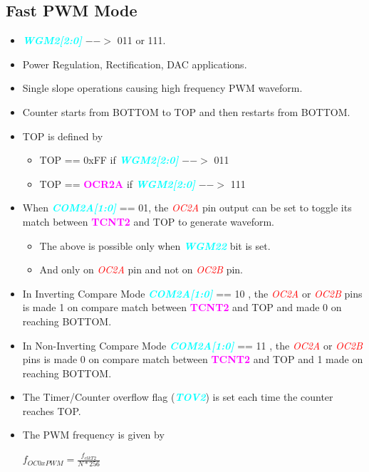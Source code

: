 \documentclass{article}
\newcommand{\bitFormat}[1]{\emph{\textbf{\textcolor{cyan}{#1}}}}
\newcommand{\regFormat}[1]{\textbf{\textcolor{magenta}{#1}}}
\newcommand{\pinFormat}[1]{\emph{\textcolor{red}{#1}}}
\begin{document}
\subsection{Fast PWM Mode}
\begin{itemize}
    \item \bitFormat{WGM2[2:0]} $-->$ 011 or 111.
    \item Power Regulation, Rectification, DAC applications.
    \item Single slope operations causing high frequency PWM waveform.
    \item Counter starts from BOTTOM to TOP and then restarts from BOTTOM.
    \item TOP is defined by
    \begin{itemize}
        \item TOP == 0xFF if \bitFormat{WGM2[2:0]} $-->$ 011
        \item TOP == \regFormat{OCR2A} if \bitFormat{WGM2[2:0]} $-->$ 111
    \end{itemize}
    \item  When \bitFormat{COM2A[1:0]} == 01, the \pinFormat{OC2A} pin output can be set to toggle its match between \regFormat{TCNT2} and TOP to generate waveform.
    \begin{itemize}
        \item The above is possible only when \bitFormat{WGM22} bit is set.
        \item And only on \pinFormat{OC2A} pin and not on \pinFormat{OC2B} pin.
    \end{itemize}
    \item In Inverting Compare Mode \bitFormat{COM2A[1:0]} == 10 , the \pinFormat{OC2A} or \pinFormat{OC2B} pins is made 1 on compare match between \regFormat{TCNT2} and TOP and made 0 on reaching BOTTOM.
    \item In Non-Inverting Compare Mode \bitFormat{COM2A[1:0]} == 11 , the \pinFormat{OC2A} or \pinFormat{OC2B} pins is made 0 on compare match between \regFormat{TCNT2} and TOP and 1 made  on reaching BOTTOM.
    \item The Timer/Counter overflow flag (\bitFormat{TOV2}) is set each time the counter reaches TOP.
    \item The PWM frequency is given by 
    \begin{center}
        { \Large $f_{OC0xPWM} = \frac{f_{clkT2}}{N * 256}$ }
    \end{center}
\end{itemize}
\end{document}
